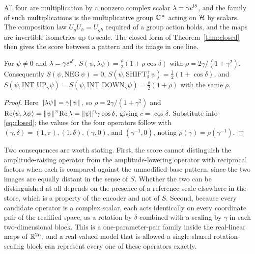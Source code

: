 All four are multiplication by a nonzero complex scalar $\lambda=\gamma e^{\mathrm{i}\delta}$, and the family of such multiplications is the multiplicative group $\mathbb{C}^\times$ acting on $\mathcal{H}$ by scalars. The composition law $U_gU_h=U_{gh}$ required of a group action holds, and the maps are invertible isometries up to scale. The closed form of Theorem~\ref{thm:closed} then gives the score between a pattern and its image in one line.

\begin{proposition}\label{prop:opimage}
For $\psi\ne0$ and $\lambda=\gamma e^{\mathrm{i}\delta}$, $S(\psi,\lambda\psi)=\frac\rho2(1+\rho\cos\delta)$ with $\rho=2\gamma/(1+\gamma^2)$. Consequently $S(\psi,\mathrm{NEG}\,\psi)=0$, $S(\psi,\mathrm{SHIFT}^+_\delta\psi)=\frac12(1+\cos\delta)$, and $S(\psi,\mathrm{INT\_UP}_\gamma\psi)=S(\psi,\mathrm{INT\_DOWN}_\gamma\psi)=\frac\rho2(1+\rho)$ with the same $\rho$.
\end{proposition}

\begin{proof}
Here $\lVert \lambda\psi\rVert=\gamma\lVert \psi\rVert$, so $\rho=2\gamma/(1+\gamma^2)$ and $\operatorname{Re}\langle \psi,\lambda\psi\rangle=\lVert \psi\rVert^2\operatorname{Re}\lambda=\lVert \psi\rVert^2\gamma\cos\delta$, giving $c=\cos\delta$. Substitute into \eqref{eq:closed}; the values for the four operators follow with $(\gamma,\delta)=(1,\pi),(1,\delta),(\gamma,0)$, and $(\gamma^{-1},0)$, noting $\rho(\gamma)=\rho(\gamma^{-1})$.
\end{proof}

Two consequences are worth stating. First, the score cannot distinguish the amplitude-raising operator from the amplitude-lowering operator with reciprocal factors when each is compared against the unmodified base pattern, since the two images are equally distant in the sense of $S$. Whether the two can be distinguished at all depends on the presence of a reference scale elsewhere in the store, which is a property of the encoder and not of $S$. Second, because every candidate operator is a complex scalar, each acts identically on every coordinate pair of the realified space, as a rotation by $\delta$ combined with a scaling by $\gamma$ in each two-dimensional block. This is a one-parameter-pair family inside the real-linear maps of $\mathbb{R}^{2n}$, and a real-valued model that is allowed a single shared rotation-scaling block can represent every one of these operators exactly.

